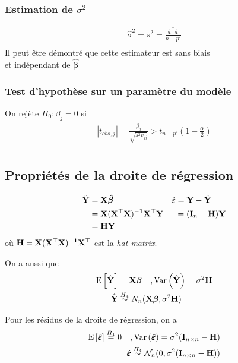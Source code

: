 \documentclass[10pt, french]{article}
\begin{document}
\begin{multicols*}{3}
\subsubsection*{Estimation de $\sigma^2$}
\begin{align*}
\hat{\sigma}^2 = s^2 = \frac{\hat{\bm{\varepsilon}}^\top \hat{\bm{\varepsilon}}}{n-p'} \\
\end{align*}
Il peut être démontré que cette estimateur est sans biais \\
et indépendant de $\bm{\hat{\beta}}$

\subsubsection*{Test d'hypothèse sur un paramètre du modèle}
On rejète $H_0 : \beta_j = 0$ si
\begin{align*}
|t_{obs, j}| = \frac{\beta_j}{\sqrt{s^2 v_{jj}} } > t_{n-p'}\left(1 - \frac{\alpha}{2} \right) \\
\end{align*}

\subsection*{Propriétés de la droite de régression}
\begin{align*}
	\hat{\mathbf{Y}}	& = \mathbf{X} \bm{\hat{\beta}}  &&\hat{\varepsilon} = \mathbf{Y} - \hat{\mathbf{Y}}\\
		& = \mathbf{X(X^\top X)^{-1} X^\top Y} && \:\:= (\mathbf{I}_n - \mathbf{H})\mathbf{Y}	\\
		& = \mathbf{H Y} 
\end{align*}	
où $\mathbf{H = X(X^\top X)^{-1}X^\top}$ est la \textit{hat matrix}.

On a aussi que
\begin{align*}
\mathrm{E} \left[ \hat{\mathbf{Y}} \right] & = \mathbf{X} \bm{\beta} \quad , \mathrm{Var} \left( \hat{\mathbf{Y}} \right) = \sigma^2 \mathbf{H} \\
\hat{\mathbf{Y}} & \overset{H_4}{\sim} N_n(\mathbf{X} \bm{\beta} , \sigma^2 \mathbf{H}) \\
\end{align*}

Pour les résidus de la droite de régression, on a
\begin{align*}
\mathrm{E} \left[ \hat{\bm{\varepsilon}} \right]  \overset{H_1}{=} 0 \quad , \mathrm{Var} \left( \hat{\bm{\varepsilon}} \right) = \sigma^2(\mathbf{I}_{n \times n} - \mathbf{H}) \\
\hat{\bm{\varepsilon}} \overset{H_4}{\sim} \mathcal{N}_n(0, \sigma^2 (\mathbf{I}_{n \times n} - \mathbf{H})) \\
\end{align*}


\end{multicols*}
\end{document}
